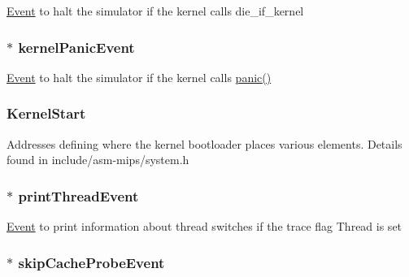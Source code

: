 \label{classLinuxMipsSystem_a84afa728bab9addbfe1a66374c9093b5}
\hyperlink{classEvent}{Event} to halt the simulator if the kernel calls die\_\-if\_\-kernel \hypertarget{classLinuxMipsSystem_aa052aa785f60b08b9c27dfe6838686e4}{
\subsubsection[{kernelPanicEvent}]{$\ast$ {\bf kernelPanicEvent}}}
\label{classLinuxMipsSystem_aa052aa785f60b08b9c27dfe6838686e4}
\hyperlink{classEvent}{Event} to halt the simulator if the kernel calls \hyperlink{base_2misc_8hh_a1445e207e36c97ff84c54b47288cea19}{panic()} \hypertarget{classLinuxMipsSystem_a586fffad970b7236ceaab6d5cb3eb9d0}{
\subsubsection[{KernelStart}]{ {\bf KernelStart}}}
\label{classLinuxMipsSystem_a586fffad970b7236ceaab6d5cb3eb9d0}
Addresses defining where the kernel bootloader places various elements. Details found in include/asm-\/mips/system.h \hypertarget{classLinuxMipsSystem_ad433ad9dba393cab0cb0b67f6d3d58ab}{
\subsubsection[{printThreadEvent}]{$\ast$ {\bf printThreadEvent}}}
\label{classLinuxMipsSystem_ad433ad9dba393cab0cb0b67f6d3d58ab}
\hyperlink{classEvent}{Event} to print information about thread switches if the trace flag Thread is set \hypertarget{classLinuxMipsSystem_aa2dee1f9674e5ea129c2c31d05ce6412}{
\subsubsection[{skipCacheProbeEvent}]{$\ast$ {\bf skipCacheProbeEvent}}}
